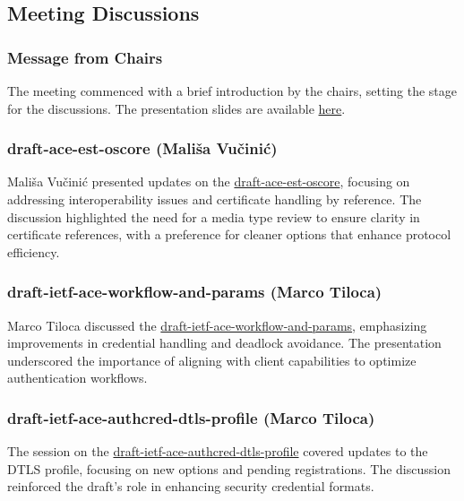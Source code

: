 \documentclass{article}
\begin{document}
\subsection{Meeting Discussions}

\subsubsection{Message from Chairs}

The meeting commenced with a brief introduction by the chairs, setting the stage for the discussions. The presentation slides are available \href{https://datatracker.ietf.org/meeting/122/materials/slides-122-ace-chair-slides-ace-00}{here}.

\subsubsection{draft-ace-est-oscore (Mališa Vučinić)}

Mališa Vučinić presented updates on the \href{https://datatracker.ietf.org/doc/html/draft-ietf-ace-est-oscore}{draft-ace-est-oscore}, focusing on addressing interoperability issues and certificate handling by reference. The discussion highlighted the need for a media type review to ensure clarity in certificate references, with a preference for cleaner options that enhance protocol efficiency.

\subsubsection{draft-ietf-ace-workflow-and-params (Marco Tiloca)}

Marco Tiloca discussed the \href{https://datatracker.ietf.org/doc/html/draft-ietf-ace-workflow-and-params}{draft-ietf-ace-workflow-and-params}, emphasizing improvements in credential handling and deadlock avoidance. The presentation underscored the importance of aligning with client capabilities to optimize authentication workflows.

\subsubsection{draft-ietf-ace-authcred-dtls-profile (Marco Tiloca)}

The session on the \href{https://datatracker.ietf.org/doc/html/draft-ietf-ace-authcred-dtls-profile}{draft-ietf-ace-authcred-dtls-profile} covered updates to the DTLS profile, focusing on new options and pending registrations. The discussion reinforced the draft's role in enhancing security credential formats.
\end{document}
